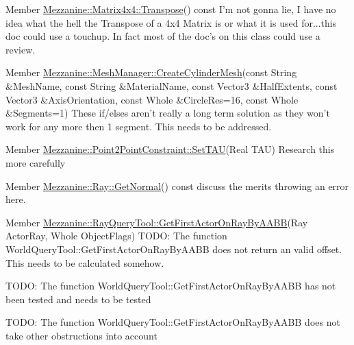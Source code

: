 \label{todo__todo000021}
\hypertarget{todo__todo000021}{}
 
\begin{DoxyDescription}
\item[Member \hyperlink{classMezzanine_1_1Matrix4x4_a1330573388a3070bc747bad97d93d3e9}{Mezzanine::Matrix4x4::Transpose}() const  ]I'm not gonna lie, I have no idea what the hell the Transpose of a 4x4 Matrix is or what it is used for...this doc could use a touchup. In fact most of the doc's on this class could use a review. 
\end{DoxyDescription}

\label{todo__todo000022}
\hypertarget{todo__todo000022}{}
 
\begin{DoxyDescription}
\item[Member \hyperlink{classMezzanine_1_1MeshManager_a6de2e01b43302a9439dc01c1dcc90f4c}{Mezzanine::MeshManager::CreateCylinderMesh}(const String \&MeshName, const String \&MaterialName, const Vector3 \&HalfExtents, const Vector3 \&AxisOrientation, const Whole \&CircleRes=16, const Whole \&Segments=1) ]These if/elses aren't really a long term solution as they won't work for any more then 1 segment. This needs to be addressed. 
\end{DoxyDescription}

\label{todo__todo000010}
\hypertarget{todo__todo000010}{}
 
\begin{DoxyDescription}
\item[Member \hyperlink{classMezzanine_1_1Point2PointConstraint_a9eba349fe0f12483330b9c309e305168}{Mezzanine::Point2PointConstraint::SetTAU}(Real TAU) ]Research this more carefully 
\end{DoxyDescription}

\label{todo__todo000024}
\hypertarget{todo__todo000024}{}
 
\begin{DoxyDescription}
\item[Member \hyperlink{classMezzanine_1_1Ray_a7164d929caf75bcebceed9149e9a3540}{Mezzanine::Ray::GetNormal}() const  ]discuss the merits throwing an error here. 
\end{DoxyDescription}

\label{todo__todo000025}
\hypertarget{todo__todo000025}{}
 
\begin{DoxyDescription}
\item[Member \hyperlink{classMezzanine_1_1RayQueryTool_a9ded1647755a523d3dbda297a0e73eba}{Mezzanine::RayQueryTool::GetFirstActorOnRayByAABB}(Ray ActorRay, Whole ObjectFlags) ]TODO: The function WorldQueryTool::GetFirstActorOnRayByAABB does not return an valid offset. This needs to be calculated somehow. 

TODO: The function WorldQueryTool::GetFirstActorOnRayByAABB has not been tested and needs to be tested 

TODO: The function WorldQueryTool::GetFirstActorOnRayByAABB does not take other obstructions into account 
\end{DoxyDescription}

